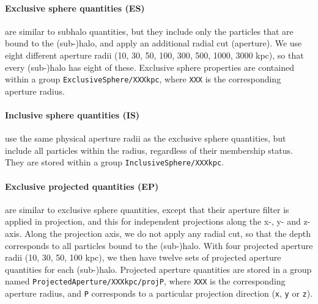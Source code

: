 \documentclass{article}
\begin{document}
\paragraph{Exclusive sphere quantities (ES)} are similar to subhalo quantities, but they include only the 
particles that are bound to the (sub-)halo, and apply an additional radial cut (aperture). We use eight 
different aperture radii (10, 30, 50, 100, 300, 500, 1000, 3000 kpc), so that every (sub-)halo has eight of 
these. Exclusive sphere properties are contained within a group \verb+ExclusiveSphere/XXXkpc+, where 
\verb+XXX+ is the corresponding aperture radius.

\paragraph{Inclusive sphere quantities (IS)} use the same physical aperture radii as the exclusive sphere 
quantities, but include all particles within the radius, regardless of their membership status. They are
stored within a group \verb+InclusiveSphere/XXXkpc+.

\paragraph{Exclusive projected quantities (EP)} are similar to exclusive sphere quantities, except that their 
aperture filter is applied in projection, and this for independent projections along the x-, y- and z-axis. 
Along the projection axis, we do not apply any radial cut, so that the depth corresponds to all particles 
bound to the (sub-)halo. With four projected aperture radii (10, 30, 50, 100 kpc), we then have twelve sets of 
projected aperture quantities for each (sub-)halo. Projected aperture quantities are stored in a group named 
\verb+ProjectedAperture/XXXkpc/projP+, where \verb+XXX+ is the corresponding aperture radius, and \verb+P+ 
corresponds to a particular projection direction (\verb+x+, \verb+y+ or \verb+z+).
\end{document}
